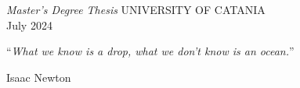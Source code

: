 \documentclass[
11pt, %
english, %
singlespacing, %
headsepline, %
]{MastersDoctoralThesis} %
\theoremstyle{plain}
\theoremstyle{definition}
\theoremstyle{remark}
\newcommand\alcentropagina[1]{\AddToShipoutPicture{%
		\AtPageCenter{\makebox(50,0){\texttt{[image: \#1]}}}}}
\begin{document}
\begin{titlepage}
	\begin{center}
		\alcentropagina{Figures/logos/logounict_v2.pdf}
		\vspace{21cm}
		\makeatletter
		\large\textrm{\authorname}
		\makeatother
		\vspace{8.85cm}
		\begin{center}
			\makeatletter
			\singlespacing\Huge\textsc{\ttitle}
			\makeatother
		\end{center}%
		\vspace{0.4cm}
		\makeatletter
		\large\textit{Master's Degree Thesis}
		\makeatother
		\vfill
		\large UNIVERSITY OF CATANIA\\
		\vspace{1cm}
		\makeatletter
		\large\textrm{July 2024} %
		\makeatother
	\end{center}
\end{titlepage}

\ClearShipoutPicture



\restoregeometry

\pagestyle{plain} %



\vspace*{0.2\textheight}

\noindent\enquote{\itshape What we know is a drop, what we don't know is an ocean.}\bigbreak

\hfill Isaac Newton


\end{document}
